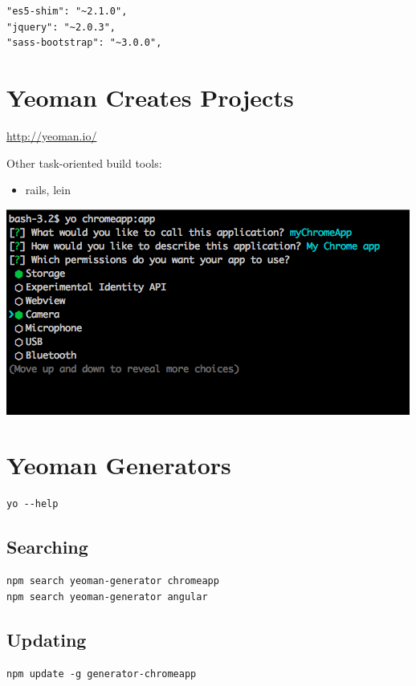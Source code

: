 \documentclass[11pt]{article}
\begin{document}
\begin{verbatim}
"es5-shim": "~2.1.0",
"jquery": "~2.0.3",
"sass-bootstrap": "~3.0.0",
\end{verbatim}
\section*{Yeoman Creates Projects}
\label{sec-15}

\url{http://yeoman.io/}

Other task-oriented build tools: 

\begin{itemize}
\item rails, lein
\end{itemize}

\includegraphics[width=.9\linewidth]{gdg_2013-11-18_yo_grunt_bower/eg-yo.png}
\section*{Yeoman Generators}
\label{sec-16}

\begin{verbatim}
yo --help
\end{verbatim}

\subsection*{Searching}
\label{sec-16-1}

\begin{verbatim}
npm search yeoman-generator chromeapp
npm search yeoman-generator angular
\end{verbatim}
\subsection*{Updating}
\label{sec-16-2}

\begin{verbatim}
npm update -g generator-chromeapp
\end{verbatim}
\end{document}

